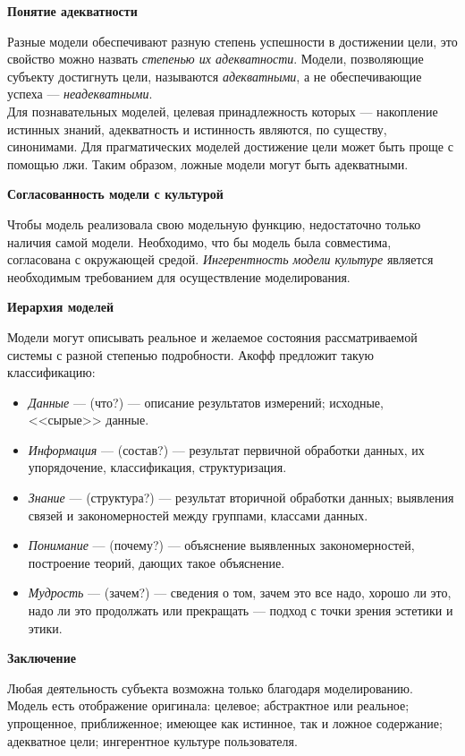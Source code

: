 \documentclass{article}
\newcommand{\note}[1]{\textit{#1}}
\renewcommand{\subsection}[1]{
	\vspace{2em}
	\begin{flushright}
		\large
		\textbf{#1}
	\end{flushright}
	}
\begin{document}
\subsection{Понятие адекватности}
Разные модели обеспечивают разную степень успешности в достижении цели, это свойство можно назвать \note{степенью их адекватности}. Модели, позволяющие субъекту достигнуть цели, называются \note{адекватными}, а не обеспечивающие успеха --- \note{неадекватными}.\\
Для познавательных моделей, целевая принадлежность которых --- накопление истинных знаний, адекватность и истинность являются, по существу, синонимами. Для прагматических моделей достижение цели может быть проще с помощью лжи. Таким образом, ложные модели могут быть адекватными.
\subsection{Согласованность модели с культурой}
Чтобы модель реализовала свою модельную функцию, недостаточно только наличия самой модели. Необходимо, что бы модель была совместима, согласована с окружающей средой. \note{Ингерентность модели культуре} является необходимым требованием для осуществление моделирования.
\subsection{Иерархия моделей}
Модели могут описывать реальное и желаемое состояния рассматриваемой системы с разной степенью подробности. Акофф предложит такую классификацию:
\begin{itemize}
	\item \note{Данные} --- (что?) --- описание результатов измерений; исходные, <<сырые>> данные.
	\item \note{Информация} --- (состав?) --- результат первичной обработки данных, их упорядочение, классификация, структуризация.
	\item \note{Знание} --- (структура?) --- результат вторичной обработки данных; выявления связей и закономерностей между группами, классами данных.
	\item \note{Понимание} --- (почему?) --- объяснение выявленных закономерностей, построение теорий, дающих такое объяснение.
	\item \note{Мудрость} --- (зачем?) --- сведения о том, зачем это все надо, хорошо ли это, надо ли это продолжать или прекращать --- подход с точки зрения эстетики и этики.
\end{itemize}
\subsection{Заключение}
Любая деятельность субъекта возможна только благодаря моделированию.\\
Модель есть отображение оригинала: целевое; абстрактное или реальное; упрощенное, приближенное; имеющее как истинное, так и ложное содержание; адекватное цели; ингерентное культуре пользователя.
\end{document}

